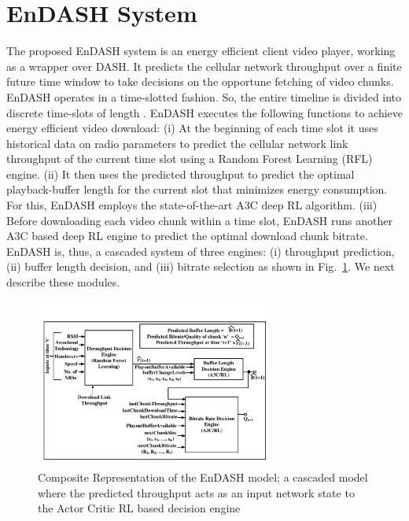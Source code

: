 \section{\textbf{EnDASH System}}\label{sec:chap04:sys_overview}
The proposed EnDASH system is an energy efficient client video player, working as a wrapper over \ac{DASH}. It predicts the cellular network throughput over a finite future time window to take decisions on the opportune fetching of  video chunks.  EnDASH operates in a time-slotted fashion. So, the entire timeline is divided into discrete time-slots of length .
EnDASH executes the following functions to achieve energy efficient video download: (i) At the beginning of each time slot it uses historical data on radio parameters to predict the cellular network link throughput of the current time slot using a Random Forest Learning (RFL) engine. (ii) It then uses the predicted throughput to predict the optimal playback-buffer length for the current slot that minimizes energy consumption. For this, EnDASH employs the state-of-the-art \ac{A3C} deep \ac{RL} algorithm.  (iii) Before downloading each video chunk within a time slot, EnDASH runs another A3C based deep \ac{RL} engine to predict the optimal download chunk  bitrate. 
EnDASH is, thus, a cascaded system of three engines: (i) throughput prediction, (ii) buffer length decision,  and (iii) bitrate selection as shown in Fig.~\ref{fig:chap04:EnDASH system}. We next describe these modules.
 \begin{figure}[t]
	\centering
	\includegraphics[width = 0.7\textwidth,trim = {1cm 1cm 1cm 1cm}]{figures/EnDASH_system.pdf}
	\caption{Composite Representation of the EnDASH model; a cascaded model where the predicted throughput acts as an input network state to the Actor Critic \ac{RL} based decision engine}
	\label{fig:chap04:EnDASH system}
\end{figure}
